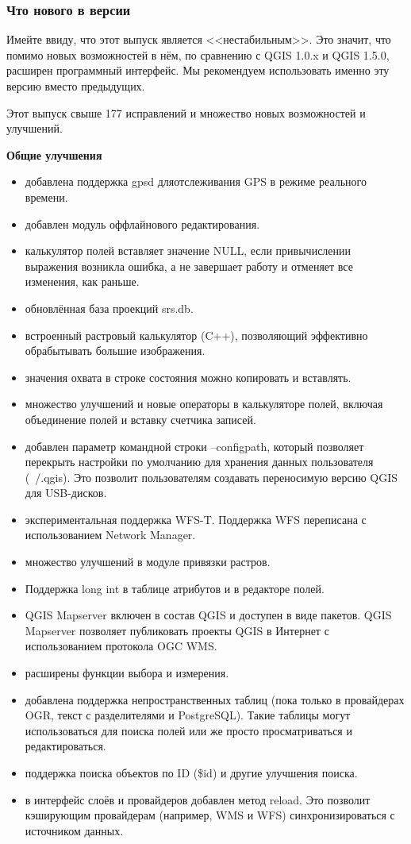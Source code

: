\subsubsection{Что нового в версии \CURRENT}

Имейте ввиду, что этот выпуск является <<нестабильным>>. Это значит, что
помимо новых возможностей в нём, по сравнению с QGIS 1.0.x и QGIS 1.5.0,
расширен программный интерфейс. Мы рекомендуем использовать именно эту
версию вместо предыдущих.

Этот выпуск свыше 177 исправлений и множество новых возможностей и улучшений.

\textbf{Общие улучшения}

\begin{itemize}[label=--]
\item добавлена поддержка gpsd дляотслеживания GPS в режиме реального времени.
\item добавлен модуль оффлайнового редактирования.
\item калькулятор полей вставляет значение NULL, если привычислении выражения
возникла ошибка, а не завершает работу и отменяет все изменения, как раньше.
\item обновлённая база проекций srs.db.
\item встроенный растровый калькулятор (C++), позволяющий эффективно обрабытывать
большие изображения.
\item значения охвата в строке состояния можно копировать и вставлять.
\item множество улучшений и новые операторы в калькуляторе полей, включая
объединение полей и вставку счетчика записей.
\item добавлен параметр командной строки --configpath, который позволяет
перекрыть настройки по умолчанию для хранения данных пользователя (~/.qgis).
Это позволит пользователям создавать переносимую версию QGIS для USB-дисков.
\item экспериментальная поддержка WFS-T. Поддержка WFS переписана с
использованием Network Manager.
\item множество улучшений в модуле привязки растров.
\item Поддержка long int в таблице атрибутов и в редакторе полей.
\item QGIS Mapserver включен в состав QGIS и доступен в виде пакетов.
QGIS Mapserver позволяет публиковать проекты QGIS в Интернет с использованием
протокола OGC WMS.
\item расширены функции выбора и измерения.
\item добавлена поддержка непространственных таблиц (пока только в провайдерах
OGR, текст с разделителями и PostgreSQL). Такие таблицы могут использоваться
для поиска полей или же просто просматриваться и редактироваться.
\item поддержка поиска объектов по ID (\$id) и другие улучшения поиска.
\item в интерфейс слоёв и провайдеров добавлен метод reload. Это позволит
кэширующим провайдерам (например, WMS и WFS) синхронизироваться с источником
данных.
\end{itemize}

